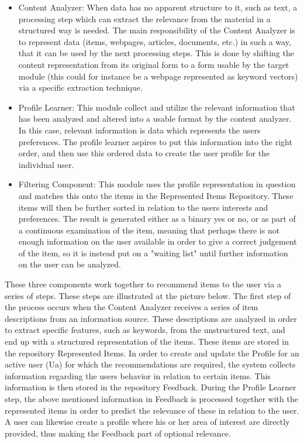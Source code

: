\begin{itemize}
	\item Content Analyzer: When data has no apparent structure to it, such as text, a processing step which can extract the relevance from the material in a structured way is needed. The main responsibility of the Content Analyzer is to represent data (items, webpages, articles, documents, etc.) in such a way, that it can be used by the next processing steps. This is done by shifting the content representation from its original form to a form usable by the target module (this could for instance be a webpage represented as keyword vectors) via a specific extraction technique.
	\item Profile Learner: This module collect and utilize the relevant information that has been analyzed and altered into a usable format by the content analyzer. In this case, relevant information is data which represents the users preferences. The profile learner aspires to put this information into the right order, and then use this ordered data to create the user profile for the individual user.
	\item Filtering Component: This module uses the profile representation in question and matches this onto the items in the Represented Items Repository. These items will then be further sorted in relation to the users interests and preferences. The result is generated either as a binary yes or no, or as part of a continuous examination of the item, meaning that perhaps there is not enough information on the user available in order to give a correct judgement of the item, so it is instead put on a "waiting list" until further information on the user can be analyzed.
\end{itemize}
These three components work together to recommend items to the user via a series of steps. These steps are illustrated at the picture below. The first step of the process occurs when the Content Analyzer receives a series of item descriptions from an information source. These descriptions are analyzed in order to extract specific features, such as keywords, from the unstructured text, and end up with a structured representation of the items. These items are stored in the repository Represented Items. In order to create and update the Profile for an active user (Ua) for which the recommendations are required, the system collects information regarding the users behavior in relation to certain items. This information is then stored in the repository Feedback.
During the Profile Learner step, the above mentioned information in Feedback is processed together with the represented items in order to predict the relevance of these in relation to the user. A user can likewise create a profile where his or her area of interest are directly provided, thus making the Feedback part of optional relevance.

